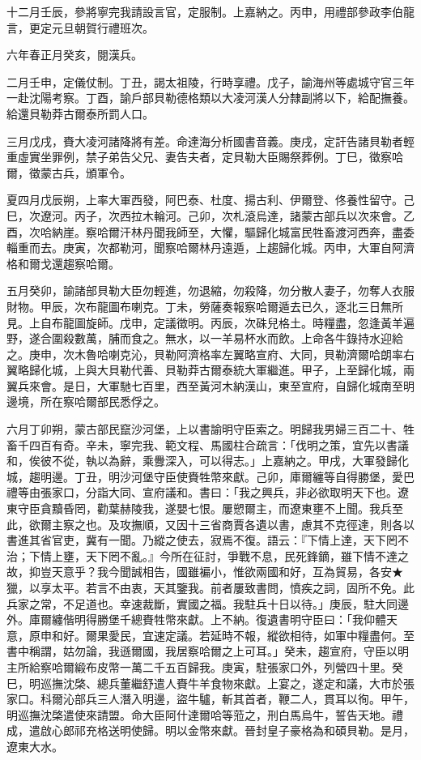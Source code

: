 \begin{pinyinscope}
十二月壬辰，參將寧完我請設言官，定服制。上嘉納之。丙申，用禮部參政李伯龍言，更定元旦朝賀行禮班次。

六年春正月癸亥，閱漢兵。

二月壬申，定儀仗制。丁丑，謁太祖陵，行時享禮。戊子，諭海州等處城守官三年一赴沈陽考察。丁酉，諭戶部貝勒德格類以大凌河漢人分隸副將以下，給配撫養。給還貝勒莽古爾泰所罰人口。

三月戊戌，賚大凌河諸降將有差。命達海分析國書音義。庚戌，定訐告諸貝勒者輕重虛實坐罪例，禁子弟告父兄、妻告夫者，定貝勒大臣賜祭葬例。丁巳，徵察哈爾，徵蒙古兵，頒軍令。

夏四月戊辰朔，上率大軍西發，阿巴泰、杜度、揚古利、伊爾登、佟養性留守。己巳，次遼河。丙子，次西拉木輪河。己卯，次札滾烏達，諸蒙古部兵以次來會。乙酉，次哈納崖。察哈爾汗林丹聞我師至，大懼，驅歸化城富民牲畜渡河西奔，盡委輜重而去。庚寅，次都勒河，聞察哈爾林丹遠遁，上趨歸化城。丙申，大軍自阿濟格和爾戈還趨察哈爾。

五月癸卯，諭諸部貝勒大臣勿輕進，勿退縮，勿殺降，勿分散人妻子，勿奪人衣服財物。甲辰，次布龍圖布喇克。丁未，勞薩奏報察哈爾遁去已久，逐北三日無所見。上自布龍圖旋師。戊申，定議徵明。丙辰，次硃兒格土。時糧盡，忽逢黃羊遍野，遂合圍殺數萬，脯而食之。無水，以一羊易杯水而飲。上命各牛錄持水迎給之。庚申，次木魯哈喇克沁，貝勒阿濟格率左翼略宣府、大同，貝勒濟爾哈朗率右翼略歸化城，上與大貝勒代善、貝勒莽古爾泰統大軍繼進。甲子，上至歸化城，兩翼兵來會。是日，大軍馳七百里，西至黃河木納漢山，東至宣府，自歸化城南至明邊境，所在察哈爾部民悉俘之。

六月丁卯朔，蒙古部民竄沙河堡，上以書諭明守臣索之。明歸我男婦三百二十、牲畜千四百有奇。辛未，寧完我、範文程、馬國柱合疏言：「伐明之策，宜先以書議和，俟彼不從，執以為辭，乘釁深入，可以得志。」上嘉納之。甲戌，大軍發歸化城，趨明邊。丁丑，明沙河堡守臣使賚牲幣來獻。己卯，庫爾纏等自得勝堡，愛巴禮等由張家口，分詣大同、宣府議和。書曰：「我之興兵，非必欲取明天下也。遼東守臣貪黷昏罔，勸葉赫陵我，遂嬰七恨。屢愬爾主，而遼東壅不上聞。我兵至此，欲爾主察之也。及攻撫順，又因十三省商賈各遺以書，慮其不克徑達，則各以書進其省官吏，冀有一聞。乃縱之使去，寂焉不復。語云：『下情上達，天下罔不治；下情上壅，天下罔不亂。』今所在征討，爭戰不息，民死鋒鏑，雖下情不達之故，抑豈天意乎？我今聞誠相告，國雖褊小，惟欲兩國和好，互為貿易，各安★獵，以享太平。若言不由衷，天其鑒我。前者屢致書問，憤疾之詞，固所不免。此兵家之常，不足道也。幸速裁斷，實國之福。我駐兵十日以待。」庚辰，駐大同邊外。庫爾纏偕明得勝堡千總賚牲幣來獻。上不納。復遺書明守臣曰：「我仰體天意，原申和好。爾果愛民，宜速定議。若延時不報，縱欲相待，如軍中糧盡何。至書中稱謂，姑勿論，我遜爾國，我居察哈爾之上可耳。」癸未，趨宣府，守臣以明主所給察哈爾緞布皮幣一萬二千五百歸我。庚寅，駐張家口外，列營四十里。癸巳，明巡撫沈棨、總兵董繼舒遣人賚牛羊食物來獻。上宴之，遂定和議，大市於張家口。科爾沁部兵三人潛入明邊，盜牛驢，斬其首者，鞭二人，貫耳以徇。甲午，明巡撫沈棨遣使來請盟。命大臣阿什達爾哈等蒞之，刑白馬烏牛，誓告天地。禮成，遣啟心郎祁充格送明使歸。明以金幣來獻。晉封皇子豪格為和碩貝勒。是月，遼東大水。


\end{pinyinscope}
